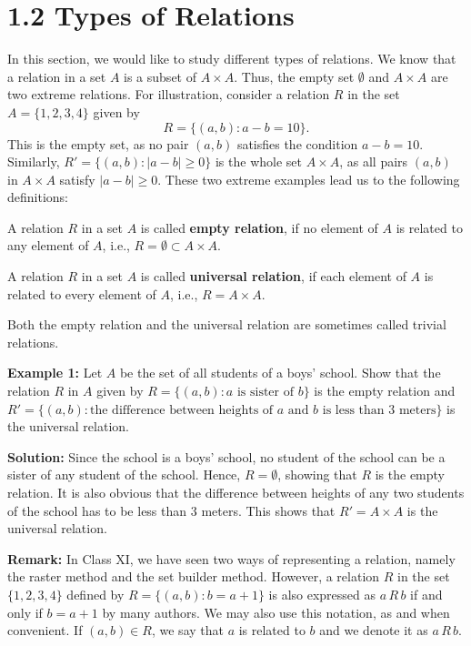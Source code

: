 \documentclass[12pt]{article}
\begin{document}
\section*{1.2 Types of Relations}

In this section, we would like to study different types of relations. We know that a relation in a set \( A \) is a subset of \( A \times A \). Thus, the empty set \( \emptyset \) and \( A \times A \) are two extreme relations. For illustration, consider a relation \( R \) in the set \( A = \{1, 2, 3, 4\} \) given by
\[
R = \{(a, b) : a - b = 10\}.
\]
This is the empty set, as no pair \( (a, b) \) satisfies the condition \( a - b = 10 \). Similarly, \( R' = \{(a, b) : |a - b| \geq 0\} \) is the whole set \( A \times A \), as all pairs \( (a, b) \) in \( A \times A \) satisfy \( |a - b| \geq 0 \). These two extreme examples lead us to the following definitions:

\begin{definition}
A relation \( R \) in a set \( A \) is called \textbf{empty relation}, if no element of \( A \) is related to any element of \( A \), i.e., \( R = \emptyset \subset A \times A \).
\end{definition}

\begin{definition}
A relation \( R \) in a set \( A \) is called \textbf{universal relation}, if each element of \( A \) is related to every element of \( A \), i.e., \( R = A \times A \).
\end{definition}

Both the empty relation and the universal relation are sometimes called trivial relations.

\textbf{Example 1:} Let \( A \) be the set of all students of a boys' school. Show that the relation \( R \) in \( A \) given by \( R = \{(a, b) : a \text{ is sister of } b\} \) is the empty relation and \( R' = \{(a, b) : \text{the difference between heights of } a \text{ and } b \text{ is less than 3 meters}\} \) is the universal relation.

\textbf{Solution:} Since the school is a boys' school, no student of the school can be a sister of any student of the school. Hence, \( R = \emptyset \), showing that \( R \) is the empty relation. It is also obvious that the difference between heights of any two students of the school has to be less than 3 meters. This shows that \( R' = A \times A \) is the universal relation.

\textbf{Remark:} In Class XI, we have seen two ways of representing a relation, namely the raster method and the set builder method. However, a relation \( R \) in the set \( \{1, 2, 3, 4\} \) defined by \( R = \{(a, b) : b = a + 1\} \) is also expressed as \( a \, R \, b \) if and only if \( b = a + 1 \) by many authors. We may also use this notation, as and when convenient. If \( (a, b) \in R \), we say that \( a \) is related to \( b \) and we denote it as \( a \, R \, b \).
\end{document}
